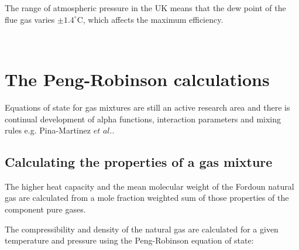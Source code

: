 \documentclass[5p]{elsarticle} %
\begin{document}
The range of atmospheric pressure in the UK means that the dew point of the flue gas varies   $\pm1.4^\circ$C, which affects the maximum efficiency.

~\\
\newpage %

\section{The Peng-Robinson calculations}

Equations of state for gas mixtures are still an active research area\citep{Lozana2022} and there is continual development of alpha functions, interaction parameters and mixing rules e.g. Pina-Martinez $et$ $al.$\citep{Pina-Martinez2019}.

\subsection{Calculating the properties of a gas mixture}
\label{sec:gasmix}
The higher heat capacity and the mean molecular weight of the Fordoun natural gas are calculated from a mole fraction weighted sum of those properties of the component pure gases.

The compressibility and density of the natural gas are calculated for a given temperature and pressure using the Peng-Robinson equation of state: 
\end{document}
